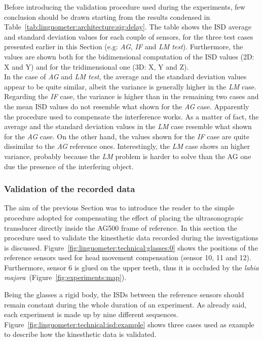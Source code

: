 Before introducing the validation procedure used during the experiments, few
conclusion should be drawn starting from the results condensed in 
Table~\ref{tab:linguometer:architecture:sig:delay}.
The table shows the ISD average and standard deviation values for each couple
of sensors, for the three test cases presented earlier in this Section 
(e.g: \emph{AG}, \emph{IF} and \emph{LM test}).
Furthermore, the values are shown both for the bidimensional
computation of the ISD values (2D: X and Y) and for the tridimensional one (3D:
X, Y and Z).\\
In the case of \emph{AG} and \emph{LM test}, the average and the standard
deviation values appear to be quite similar, albeit the variance is generally
higher in the \emph{LM} case.
Regarding the \emph{IF} case, the variance is higher than in the remaining two
cases and the mean ISD values do not resemble what shown for the \emph{AG} case.
Apparently the procedure used to compensate the interference works.
As a matter of fact, the average and the standard deviation values in the
\emph{LM} case resemble what shown for the \emph{AG} case.
On the other hand, the values shown for the \emph{IF} case are quite 
dissimilar to the \emph{AG} reference ones.
Interestingly, the \emph{LM} case shows an higher variance, probably because
the \emph{LM} problem is harder to solve than the AG one due the presence of
the interfering object.
\subsubsection{Validation of the recorded data}
The aim of the previous Section was to introduce the reader to the simple
procedure adopted for compensating the effect of placing the ultrasonograpic
transducer directly inside the AG500 frame of reference.
In this section the procedure used to validate the 
kinesthetic data recorded during the investigations is discussed.
Figure~\ref{fig:linguometer:technical:glasses:0} shows  the positions of the
reference sensors used for head movement compensation (sensor 10, 11 and 12).
Furthermore, sensor 6 is glued on the upper teeth, thus it is occluded by the 
\emph{labia majora}~(Figure~\ref{fig:experiments:map}).


Being the glasses a rigid body, the ISDs between the reference
sensors should remain constant during the whole duration of an experiment.
As already said, each experiment is made up by nine different sequences. 
Figure~\ref{fig:linguometer:technical:isd:example} shows three cases used as
example to describe how the kinesthetic data is validated.

